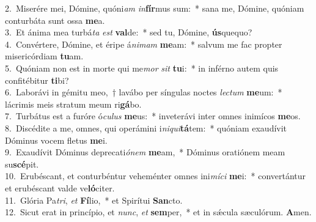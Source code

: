 {2.~}Miserére mei, Dómine, quóni\textit{am} \textit{in}\textbf{fír}mus sum:~* sana me, Dómine, quóniam conturbáta sunt ossa \textbf{me}a.\\
{3.~}Et ánima mea turbá\textit{ta} \textit{est} \textbf{val}de:~* sed tu, Dómine, \textbf{ús}quequo?\\
{4.~}Convértere, Dómine, et éripe á\textit{ni}\textit{mam} \textbf{me}am:~* salvum me fac propter misericórdiam \textbf{tu}am.\\
{5.~}Quóniam non est in morte qui me\textit{mor} \textit{sit} \textbf{tu}i:~* in inférno autem quis confitébitur \textbf{ti}bi?\\
{6.~}Laborávi in gémitu meo,~† lavábo per síngulas noctes \textit{le}\textit{ctum} \textbf{me}um:~* lácrimis meis stratum meum ri\textbf{gá}bo.\\
{7.~}Turbátus est a furóre ó\textit{cu}\textit{lus} \textbf{me}us:~* inveterávi inter omnes inimícos \textbf{me}os.\\
{8.~}Discédite a me, omnes, qui operámini i\textit{ni}\textit{qui}\textbf{tá}tem:~* quóniam exaudívit Dóminus vocem fletus \textbf{me}i.\\
{9.~}Exaudívit Dóminus deprecati\textit{ó}\textit{nem} \textbf{me}am,~* Dóminus oratiónem meam su\textbf{scé}pit.\\
{10.~}Erubéscant, et conturbéntur veheménter omnes ini\textit{mí}\textit{ci} \textbf{me}i:~* convertántur et erubéscant valde ve\textbf{ló}citer.\\
{11.~}Glória Pa\textit{tri}, \textit{et} \textbf{Fí}lio,~* et Spirítui \textbf{San}cto.\\
{12.~}Sicut erat in princípio, et \textit{nunc}, \textit{et} \textbf{sem}per,~* et in sǽcula sæculórum. \textbf{A}men.\\
